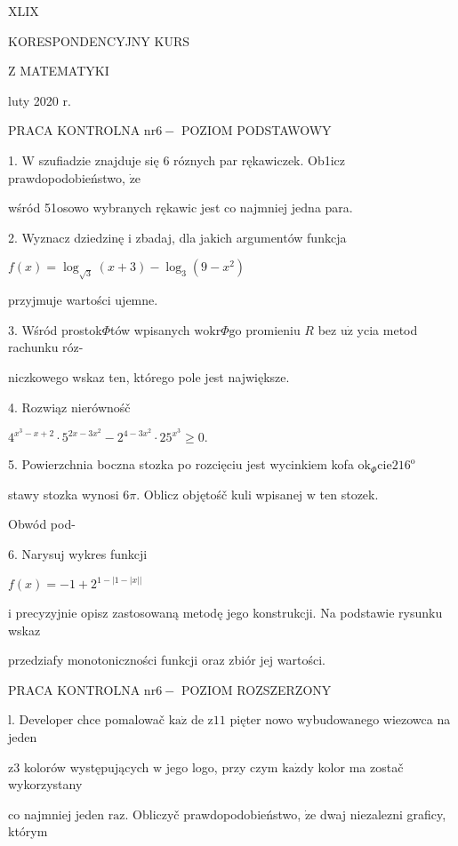 \documentclass[a4paper,12pt]{article}
\begin{document}
XLIX

KORESPONDENCYJNY KURS

Z MATEMATYKI

luty 2020 r.

PRACA KONTROLNA $\mathrm{n}\mathrm{r} 6-$ POZIOM PODSTAWOWY

1. $\mathrm{W}$ szufiadzie znajduje się 6 róznych par rękawiczek. Ob1icz prawdopodobieństwo, $\dot{\mathrm{z}}\mathrm{e}$

wśród 51osowo wybranych rękawic jest co najmniej jedna para.

2. Wyznacz dziedzinę $\mathrm{i}$ zbadaj, dla jakich argumentów funkcja

$f(x)=\log_{\sqrt{3}}(x+3)-\log_{3}(9-x^{2})$

przyjmuje wartości ujemne.

3. Wśród prostok$\Phi$tów wpisanych $\mathrm{w}\mathrm{o}\mathrm{k}\mathrm{r}\Phi \mathrm{g}\mathrm{o}$ promieniu $R$ bez $\mathrm{u}\dot{\mathrm{z}}$ ycia metod rachunku róz-

niczkowego wskaz ten, którego pole jest największe.

4. Rozwiąz nierównośč

$4^{x^{3}-x+2}\cdot 5^{2x-3x^{2}}-2^{4-3x^{2}}\cdot 25^{x^{3}}\geq 0.$

5. Powierzchnia boczna stozka po rozcięciu jest wycinkiem kofa $\mathrm{o}\mathrm{k}_{\Phi}\mathrm{c}\mathrm{i}\mathrm{e}216^{\mathrm{o}}$

stawy stozka wynosi $ 6\pi$. Oblicz objętośč kuli wpisanej $\mathrm{w}$ ten stozek.

Obwód pod-

6. Narysuj wykres funkcji

$f(x)=-1+2^{1-|1-|x||}$

i precyzyjnie opisz zastosowaną metodę jego konstrukcji. Na podstawie rysunku wskaz

przedziafy monotoniczności funkcji oraz zbiór jej wartości.




PRACA KONTROLNA $\mathrm{n}\mathrm{r} 6-$ POZIOM ROZSZERZONY

l. Developer chce pomalowač $\mathrm{k}\mathrm{a}\dot{\mathrm{z}}$ de $\mathrm{z} 11$ pięter nowo wybudowanego wiezowca na jeden

$\mathrm{z}3$ kolorów występujących $\mathrm{w}$ jego logo, przy czym $\mathrm{k}\mathrm{a}\dot{\mathrm{z}}\mathrm{d}\mathrm{y}$ kolor ma zostač wykorzystany

co najmniej jeden $\mathrm{r}\mathrm{a}\mathrm{z}$. Obliczyč prawdopodobieństwo, $\dot{\mathrm{z}}\mathrm{e}$ dwaj niezalezni graficy, którym
\end{document}
